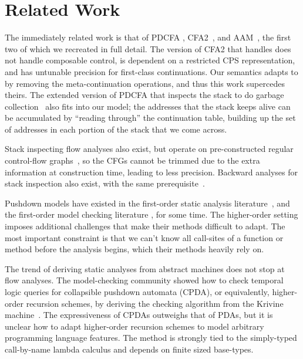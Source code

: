 \section{Related Work}

The immediately related work is that of PDCFA \citep{dvanhorn:Earl2010Pushdown, dvanhorn:Earl2012Introspective}, CFA2~\citep{ianjohnson:vardoulakis-lmcs11, ianjohnson:Vardoulakis2011Pushdown}, and AAM~\citep{dvanhorn:VanHorn2010Abstracting}, the first two of which we recreated in full detail.
%
The version of CFA2 that handles  does not handle composable control, is dependent on a restricted CPS representation, and has untunable precision for first-class continuations.
%
Our semantics adapts to  by removing the meta-continuation operations, and thus this work supercedes theirs.
%
The extended version of PDCFA that inspects the stack to do garbage collection~\citep{dvanhorn:Earl2012Introspective} also fits into our model;
the addresses that the stack keeps alive can be accumulated by ``reading through'' the continuation table, building up the set of addresses in each portion of the stack that we come across.

Stack inspecting flow analyses also exist, but operate on pre-constructed regular control-flow graphs~\citep{ianjohnson:bartoletti2004stack}, so the CFGs cannot be trimmed due to the extra information at construction time, leading to less precision.
%
Backward analyses for stack inspection also exist, with the same prerequisite~\citep{ianjohnson:DBLP:journals/sigplan/Chang06}.

Pushdown models have existed in the first-order static analysis literature~\citep[Chapter 7]{local:muchnick:jones:flow-analysis:1981}\citep{ianjohnson:reps:pushdown:1995}, and the first-order model checking literature \citep{ianjohnson:bouajiani:esparza:pushdown:1997}, for some time.
%
The higher-order setting imposes additional challenges that make their methods difficult to adapt.
%
The most important constraint is that we can't know all call-sites of a function or method before the analysis begins, which their methods heavily rely on.

The trend of deriving static analyses from abstract machines does not stop at flow analyses.
%
The model-checking community showed how to check temporal logic queries for collapsible pushdown automata (CPDA), or equivalently, higher-order recursion schemes, by deriving the checking algorithm from the Krivine machine~\citep{ianjohnson:Salvati:2011:KMH:2027223.2027239}.
%
The expressiveness of CPDAs outweighs that of PDAs, but it is unclear how to adapt higher-order recursion schemes to model arbitrary programming language features.
%
The method is strongly tied to the simply-typed call-by-name lambda calculus and depends on finite sized base-types.

